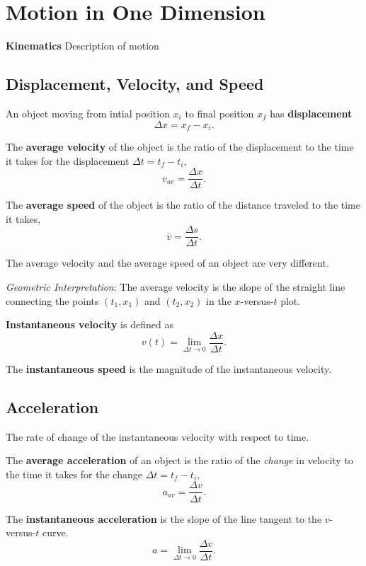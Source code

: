 \documentclass[11pt,letter]{report}
\begin{document}
\chapter*{Motion in One Dimension}

\textbf{Kinematics} Description of motion

\section*{Displacement, Velocity, and Speed}

An object moving from intial position $x_{i}$ to final position $x_{f}$ has \textbf{displacement} $$\Delta{x}=x_{f}-x_{i}.$$

\noindent
The \textbf{average velocity} of the object is the ratio of the displacement to the time it takes for the displacement $\Delta{t}=t_{f}-t_{i}$,
$$v_{av}=\frac{\Delta{x}}{\Delta{t}}.$$

\noindent
The \textbf{average speed} of the object is the ratio of the distance traveled to the time it takes, $$\bar{v}=\frac{\Delta{s}}{\Delta{t}}.$$

\noindent
The average velocity and the average speed of an object are very different.

\noindent
\textit{Geometric Interpretation}: The average velocity is the slope of the straight line connecting the points $\left(t_{1}, x_{1}\right)$ and $\left(t_{2}, x_{2}\right)$ in the $x$-versus-$t$ plot.

\noindent
\textbf{Instantaneous velocity} is defined as $$v\left(t\right)=\lim_{\Delta{t} \to 0} \frac{\Delta{x}}{\Delta{t}}.$$

\noindent
The \textbf{instantaneous speed} is the magnitude of the instantaneous velocity.

\section*{Acceleration}

The rate of change of the instantaneous velocity with respect to time.

The \textbf{average acceleration} of an object is the ratio of the \textit{change} in velocity to the time it takes for the change $\Delta{t}=t_{f}-t_{i}$, $$a_{av}=\frac{\Delta{v}}{\Delta{t}}.$$

The \textbf{instantaneous acceleration} is the slope of the line tangent to the $v$-versus-$t$ curve. $$a=\lim_{\Delta{t} \to 0} \frac{\Delta{v}}{\Delta{t}}.$$
\end{document}
